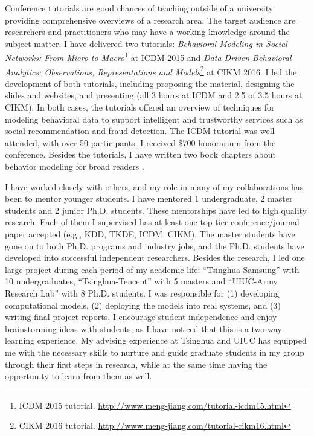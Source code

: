 \documentclass[10.5pt]{article}
\begin{document}
Conference tutorials are good chances of teaching outside of a university providing comprehensive overviews of a research area. The target audience are researchers and practitioners who may have a working knowledge around the subject matter. I have delivered two tutorials: \textit{Behavioral Modeling in Social Networks: From Micro to Macro}\footnote{ICDM 2015 tutorial. \url{http://www.meng-jiang.com/tutorial-icdm15.html}} \cite{jiang2015behavior} at ICDM 2015 and \textit{Data-Driven Behavioral Analytics: Observations, Representations and Models}\footnote{CIKM 2016 tutorial. \url{http://www.meng-jiang.com/tutorial-cikm16.html}} \cite{jiang2016data} at CIKM 2016. I led the development of both tutorials, including proposing the material, designing the slides and websites, and presenting (all 3 hours at ICDM and 2.5 of 3.5 hours at CIKM). In both cases, the tutorials offered an overview of techniques for modeling behavioral data to support intelligent and trustworthy services such as social recommendation and fraud detection. The ICDM tutorial was well attended, with over 50 participants. I received \$700 honorarium from the conference. Besides the tutorials, I have written two book chapters about behavior modeling for broad readers \cite{jiang2016mining,jiang2016behavior}.

\vskip 0.12in
\vskip 0.02in

I have worked closely with others, and my role in many of my collaborations has been to mentor younger students. I have mentored 1 undergraduate, 2 master students and 2 junior Ph.D. students. These mentorships have led to high quality research. Each of them I supervised has at least one top-tier conference/journal paper accepted (e.g., KDD, TKDE, ICDM, CIKM). The master students have gone on to both Ph.D. programs and industry jobs, and the Ph.D. students have developed into successful independent researchers. Besides the research, I led one large project during each period of my academic life: ``Tsinghua-Samsung'' with 10 undergraduates, ``Tsinghua-Tencent'' with 5 masters and ``UIUC-Army Research Lab'' with 8 Ph.D. students. I was responsible for (1) developing computational models, (2) deploying the models into real systems, and (3) writing final project reports. I encourage student independence and enjoy brainstorming ideas with students, as I have noticed that this is a two-way learning experience. My advising experience at Tsinghua and UIUC has equipped me with the necessary skills to nurture and guide graduate students in my group through their first steps in research, while at the same time having the opportunity to learn from them as well.
\end{document}
